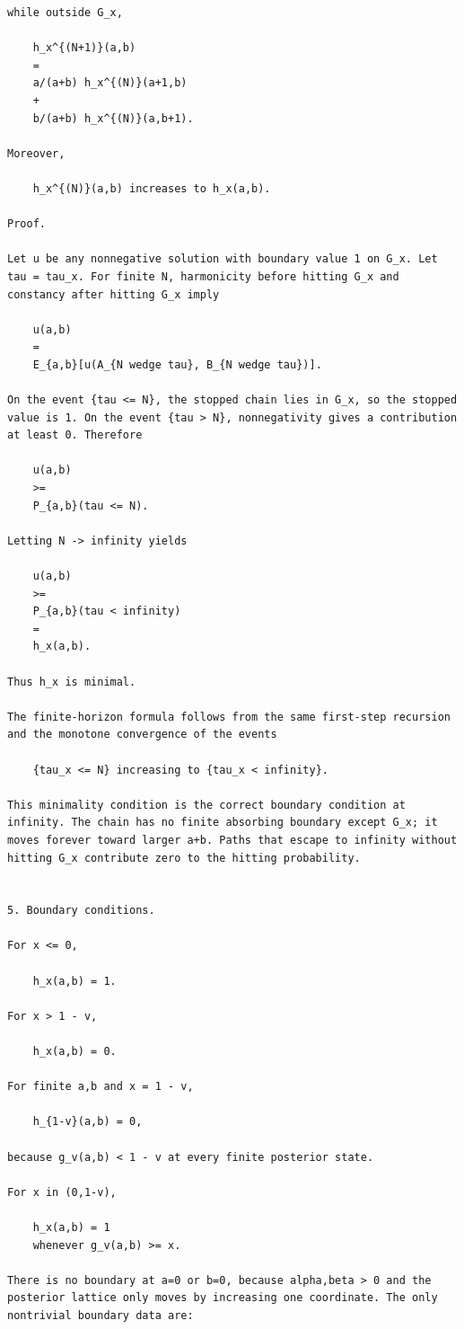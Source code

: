 \begin{small}
\begin{verbatim}
while outside G_x,

    h_x^{(N+1)}(a,b)
    =
    a/(a+b) h_x^{(N)}(a+1,b)
    +
    b/(a+b) h_x^{(N)}(a,b+1).

Moreover,

    h_x^{(N)}(a,b) increases to h_x(a,b).

Proof.

Let u be any nonnegative solution with boundary value 1 on G_x. Let tau = tau_x. For finite N, harmonicity before hitting G_x and constancy after hitting G_x imply

    u(a,b)
    =
    E_{a,b}[u(A_{N wedge tau}, B_{N wedge tau})].

On the event {tau <= N}, the stopped chain lies in G_x, so the stopped value is 1. On the event {tau > N}, nonnegativity gives a contribution at least 0. Therefore

    u(a,b)
    >=
    P_{a,b}(tau <= N).

Letting N -> infinity yields

    u(a,b)
    >=
    P_{a,b}(tau < infinity)
    =
    h_x(a,b).

Thus h_x is minimal.

The finite-horizon formula follows from the same first-step recursion and the monotone convergence of the events

    {tau_x <= N} increasing to {tau_x < infinity}.

This minimality condition is the correct boundary condition at infinity. The chain has no finite absorbing boundary except G_x; it moves forever toward larger a+b. Paths that escape to infinity without hitting G_x contribute zero to the hitting probability.


5. Boundary conditions.

For x <= 0,

    h_x(a,b) = 1.

For x > 1 - v,

    h_x(a,b) = 0.

For finite a,b and x = 1 - v,

    h_{1-v}(a,b) = 0,

because g_v(a,b) < 1 - v at every finite posterior state.

For x in (0,1-v),

    h_x(a,b) = 1
    whenever g_v(a,b) >= x.

There is no boundary at a=0 or b=0, because alpha,beta > 0 and the posterior lattice only moves by increasing one coordinate. The only nontrivial boundary data are:


\end{verbatim}
\end{small}
